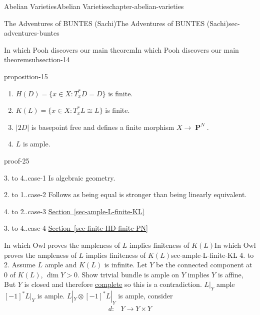 \documentclass[oneside,10pt,]{book}
\numberwithin{equation}{section}
\newcommand{\lb}{[}
\newcommand{\rb}{]}
\DeclareMathOperator{\PP}{\mathbf{P}}
\newcommand{\gt}{>}
\newcommand{\amp}{&}
\begin{document}
\begin{chapterptx}{Abelian Varieties}{}{Abelian Varieties}{}{}{chapter-abelian-varieties}
\begin{sectionptx}{The Adventures of BUNTES (Sachi)}{}{The Adventures of BUNTES (Sachi)}{}{}{sec-adventures-buntes}
\begin{subsectionptx}{In which Pooh discovers our main theorem}{}{In which Pooh discovers our main theorem}{}{}{subsection-14}
\begin{proposition}{}{}{proposition-15}
\begin{enumerate}
\item\hypertarget{li-23}{}\(H(D) = \{x\in X: T_x^*D  = D \}\) is finite.%
\item\hypertarget{li-24}{}\(K(L) = \{x\in X: T_x^*L  \cong L \}\) is finite.%
\item\hypertarget{li-25}{}\(|2D|\) is basepoint free and defines a finite morphism \(X\to \PP^N\).%
\item\hypertarget{li-26}{}\(L\) is ample.%
\end{enumerate}
%
\end{proposition}
\begin{proofptx}{}{proof-25}
\begin{case}
{}{3. to 4..}{case-1}
\hypertarget{p-142}{}%
Is algebraic geometry.%
\end{case}
\begin{case}
{}{2. to 1..}{case-2}
\hypertarget{p-143}{}%
Follows as being equal is stronger than being linearly equivalent.%
\end{case}
\begin{case}
{}{4. to 2..}{case-3}
\hypertarget{p-144}{}%
\hyperref[sec-ample-L-finite-KL]{Section~\ref{sec-ample-L-finite-KL}}%
\end{case}
\begin{case}
{}{3. to 4..}{case-4}
\hypertarget{p-145}{}%
\hyperref[sec-finite-HD-finite-PN]{Section~\ref{sec-finite-HD-finite-PN}}%
\end{case}
\end{proofptx}
\end{subsectionptx}
%
%
\typeout{************************************************}
\typeout{************************************************}
%
\begin{subsectionptx}{In which Owl proves the ampleness of \(L\) implies finiteness of \(K(L)\)}{}{In which Owl proves the ampleness of \(L\) implies finiteness of \(K(L)\)}{}{}{sec-ample-L-finite-KL}
\hypertarget{p-146}{}%
4. to 2. Assume \(L\) ample and \(K(L)\) is infinite. Let \(Y\) be the connected component at 0 of \(K(L)\), \(\dim Y \gt 0\). Show trivial bundle is ample on \(Y\) implies \(Y\) is affine, But \(Y\) is closed and therefore \hyperref[def-abelian-complete-var]{complete} so this is a contradiction. \(L|_Y\) ample \(\lb-1\rb^* L|_Y\) is ample. \(L|_Y\otimes \lb -1\rb^*L|_Y\) is ample, consider%
\begin{align*}
d\colon \amp Y \to Y\times Y\\

\end{align*}
\end{subsectionptx}
\end{sectionptx}
\end{chapterptx}
\end{document}
